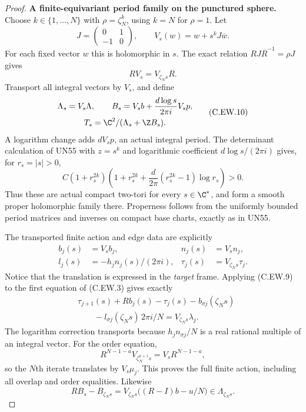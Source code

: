 \begin{proof}
\par\medskip\noindent\textbf{A finite-equivariant period family on the punctured sphere.}
Choose $k\in\{1,\ldots,N\}$ with
$\rho=\zeta_N^k$, using $k=N$ for $\rho=1$.
Let
\[
 J=\begin{pmatrix}0&1\\-1&0\end{pmatrix},\qquad
 V_s(w)=w+s^kJ\overline w.
\tag{C.EW.8}
\]
For each fixed vector $w$ this is holomorphic in $s$.
The exact relation $RJ\overline R^{-1}=\rho J$
gives
\[
                           R V_s=V_{\zeta_Ns}R.
\tag{C.EW.9}
\]
Transport all integral vectors by $V_s$, and define
\[
 \begin{gathered}
 \Lambda_s=V_s\Lambda,\qquad
 B_s=V_s b+\frac{d\log s}{2\pi i}V_s p,\\
                         T_s=\C^2/(\Lambda_s+\Z B_s).
 \end{gathered}
\tag{C.EW.10}
\]
A logarithm change adds $dV_s p$, an actual integral
period. The determinant calculation of UN55 with
$z=s^k$ and logarithmic coefficient $d\log s/(2\pi i)$
gives, for $r_s=|s|>0$,
\[
 C(1+r_s^{2k})
 \left(1+r_s^{2k}
       +\frac d{2\pi}(r_s^{2k}-1)\log r_s\right)>0.
\tag{C.EW.11}
\]
Thus these are actual compact two-tori for every
$s\in\C^*$, and form a smooth proper holomorphic
family there. Properness follows from the uniformly
bounded period matrices and inverses on compact
base charts, exactly as in UN55.

The transported finite action and edge data are explicitly
\[
 \begin{aligned}
 b_j(s)&=V_s b_j,& n_j(s)&=V_s n_j,\\
 l_j(s)&=-h_jn_j(s)/(2\pi i),&
 \tau_j(s)&=V_{\zeta_Ns}\tau_j.
 \end{aligned}
\tag{C.EW.12}
\]
Notice that the translation is expressed in the
\emph{target} frame. Applying (C.EW.9) to the first
equation of (C.EW.3) gives exactly
\[
 \begin{aligned}
 &\tau_{j+1}(s)+Rb_j(s)-\tau_j(s)-b_{\sigma j}(\zeta_Ns)\\
 &\qquad-l_{\sigma j}(\zeta_Ns)\,2\pi i/N
       =V_{\zeta_Ns}\lambda_j.
 \end{aligned}
\tag{C.EW.13}
\]
The logarithm correction transports because
$h_jn_{\sigma j}/N$ is a real rational multiple
of an integral vector. For the order equation,
\[
 R^{N-1-a}V_{\zeta_N^{a+1}s}
                         =V_sR^{N-1-a},
\]
so the $N$th iterate translates by $V_s\mu_j$.
This proves the full finite action, including all
overlap and order equalities. Likewise
\[
                    R B_s-B_{\zeta_Ns}
                   =V_{\zeta_Ns}\bigl((R-I)b-u/N\bigr)
                   \in\Lambda_{\zeta_Ns}.
\tag{C.EW.14}
\]


\end{proof}
